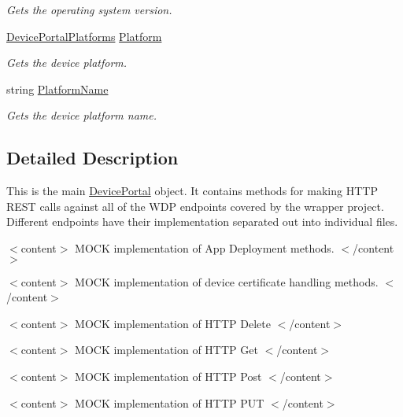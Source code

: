 \begin{DoxyCompactItemize}
\begin{DoxyCompactList}\small\item\em Gets the operating system version. \end{DoxyCompactList}\item 
\hyperlink{class_microsoft_1_1_tools_1_1_windows_device_portal_1_1_device_portal_a48a281d856cdc961d5319286d452c9b5}{Device\+Portal\+Platforms} \hyperlink{class_microsoft_1_1_tools_1_1_windows_device_portal_1_1_device_portal_a96041da10486986c32683e4fdf17b6b7}{Platform}
\begin{DoxyCompactList}\small\item\em Gets the device platform. \end{DoxyCompactList}\item 
string \hyperlink{class_microsoft_1_1_tools_1_1_windows_device_portal_1_1_device_portal_a3849b7bf6c2976022a33d04f5d07aff7}{Platform\+Name}
\begin{DoxyCompactList}\small\item\em Gets the device platform name. \end{DoxyCompactList}\end{DoxyCompactItemize}


\subsection{Detailed Description}
This is the main \hyperlink{class_microsoft_1_1_tools_1_1_windows_device_portal_1_1_device_portal}{Device\+Portal} object. It contains methods for making H\+T\+TP R\+E\+ST calls against all of the W\+DP endpoints covered by the wrapper project. Different endpoints have their implementation separated out into individual files. 

$<$content$>$ M\+O\+CK implementation of App Deployment methods. $<$/content$>$

$<$content$>$ M\+O\+CK implementation of device certificate handling methods. $<$/content$>$

$<$content$>$ M\+O\+CK implementation of H\+T\+TP Delete $<$/content$>$

$<$content$>$ M\+O\+CK implementation of H\+T\+TP Get $<$/content$>$

$<$content$>$ M\+O\+CK implementation of H\+T\+TP Post $<$/content$>$

$<$content$>$ M\+O\+CK implementation of H\+T\+TP P\+UT $<$/content$>$


